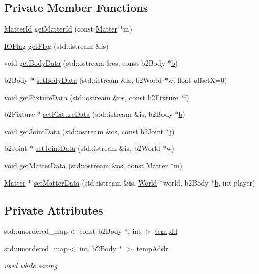 \subsection*{Private Member Functions}
\begin{DoxyCompactItemize}
\item 
\hyperlink{classSaver_a4b7186206c8281c11545f6f470ce1c4c}{Matter\+Id} \hyperlink{classSaver_aacbf5734698c3149610a4bb662e6b7a6}{get\+Matter\+Id} (const \hyperlink{classMatter}{Matter} $\ast$m)
\item 
\hyperlink{classSaver_a8a4458961f17bff6b74c5371913b96cb}{I\+O\+Flag} \hyperlink{classSaver_af7c21a193540bc5652adf01fac246b87}{get\+Flag} (std\+::istream \&is)
\item 
void \hyperlink{classSaver_a2eea54e9f257b1f1c8cee05489977f08}{get\+Body\+Data} (std\+::ostream \&os, const b2\+Body $\ast$\hyperlink{image_8h_ab2d05693952610f937e5acb3c4a8fa1b}{b})
\item 
b2\+Body $\ast$ \hyperlink{classSaver_a8c1800b9c649a6c42b1fceb20a733ad0}{set\+Body\+Data} (std\+::istream \&is, b2\+World $\ast$w, float offset\+X=0)
\item 
void \hyperlink{classSaver_ace5852ac02fc878508eb3e3453109c83}{get\+Fixture\+Data} (std\+::ostream \&os, const b2\+Fixture $\ast$f)
\item 
b2\+Fixture $\ast$ \hyperlink{classSaver_a25f2bc2d10b5657f0644d5a5b9e66b56}{set\+Fixture\+Data} (std\+::istream \&is, b2\+Body $\ast$\hyperlink{image_8h_ab2d05693952610f937e5acb3c4a8fa1b}{b})
\item 
void \hyperlink{classSaver_af47da77dffe6da1329d28606fb0ddc9e}{get\+Joint\+Data} (std\+::ostream \&os, const b2\+Joint $\ast$j)
\item 
b2\+Joint $\ast$ \hyperlink{classSaver_a7885d03e6bda27349b7c4e2963d542a4}{set\+Joint\+Data} (std\+::istream \&is, b2\+World $\ast$w)
\item 
void \hyperlink{classSaver_ad1884d3058fbdb6567bd305b5caa47ca}{get\+Matter\+Data} (std\+::ostream \&os, const \hyperlink{classMatter}{Matter} $\ast$m)
\item 
\hyperlink{classMatter}{Matter} $\ast$ \hyperlink{classSaver_a1d3368c3fe590ec0de618770e9cd46c5}{set\+Matter\+Data} (std\+::istream \&is, \hyperlink{classWorld}{World} $\ast$world, b2\+Body $\ast$\hyperlink{image_8h_ab2d05693952610f937e5acb3c4a8fa1b}{b}, int player)
\end{DoxyCompactItemize}
\subsection*{Private Attributes}
\begin{DoxyCompactItemize}
\item 
std\+::unordered\+\_\+map$<$ const b2\+Body $\ast$, int $>$ \hyperlink{classSaver_adc3e3088cb556e80d587c81a517bc6d1}{temp\+Id}
\item 
std\+::unordered\+\_\+map$<$ int, b2\+Body $\ast$ $>$ \hyperlink{classSaver_aef2dd9f1f4469247747a9b3d4dd871b6}{temp\+Addr}
\begin{DoxyCompactList}\small\item\em used while saving \end{DoxyCompactList}\end{DoxyCompactItemize}


